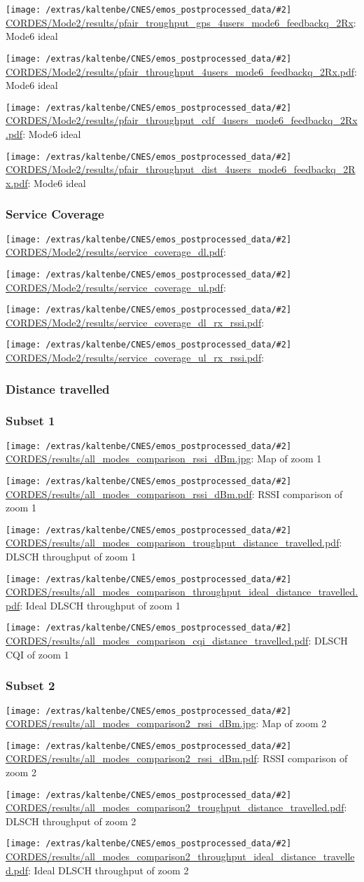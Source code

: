 \documentclass[a4paper,10pt]{article}
\newcommand{\printfile}[2][]{
 \begin{minipage}{8cm}
  \centering
  \texttt{[image: /extras/kaltenbe/CNES/emos\_postprocessed\_data/\#2]}
  \url{#2}: #1

 \end{minipage}
}
\begin{document}
\printfile[Mode6 ideal]{CORDES/Mode2/results/pfair_troughput_gps_4users_mode6_feedbackq_2Rx}
\printfile[Mode6 ideal]{CORDES/Mode2/results/pfair_throughput_4users_mode6_feedbackq_2Rx.pdf}

\printfile[Mode6 ideal]{CORDES/Mode2/results/pfair_throughput_cdf_4users_mode6_feedbackq_2Rx.pdf}
\printfile[Mode6 ideal]{CORDES/Mode2/results/pfair_throughput_dist_4users_mode6_feedbackq_2Rx.pdf}


\subsubsection{Service Coverage}

\printfile{CORDES/Mode2/results/service_coverage_dl.pdf}
\printfile{CORDES/Mode2/results/service_coverage_ul.pdf}

\printfile{CORDES/Mode2/results/service_coverage_dl_rx_rssi.pdf}
\printfile{CORDES/Mode2/results/service_coverage_ul_rx_rssi.pdf}

\subsubsection{Distance travelled}
\label{sec:dist_travelled_cordes}


\subsubsection*{Subset 1}

\printfile[Map of zoom 1]{CORDES/results/all_modes_comparison_rssi_dBm.jpg}
\printfile[RSSI comparison of zoom 1]{CORDES/results/all_modes_comparison_rssi_dBm.pdf}

\printfile[DLSCH throughput of zoom 1]{CORDES/results/all_modes_comparison_troughput_distance_travelled.pdf}
\printfile[Ideal DLSCH throughput of zoom 1]{CORDES/results/all_modes_comparison_throughput_ideal_distance_travelled.pdf}

\printfile[DLSCH CQI of zoom 1]{CORDES/results/all_modes_comparison_cqi_distance_travelled.pdf}

\subsubsection*{Subset 2}

\printfile[Map of zoom 2]{CORDES/results/all_modes_comparison2_rssi_dBm.jpg}
\printfile[RSSI comparison of zoom 2]{CORDES/results/all_modes_comparison2_rssi_dBm.pdf}

\printfile[DLSCH throughput of zoom 2]{CORDES/results/all_modes_comparison2_troughput_distance_travelled.pdf}
\printfile[Ideal DLSCH throughput of zoom 2]{CORDES/results/all_modes_comparison2_throughput_ideal_distance_travelled.pdf}
\end{document}
